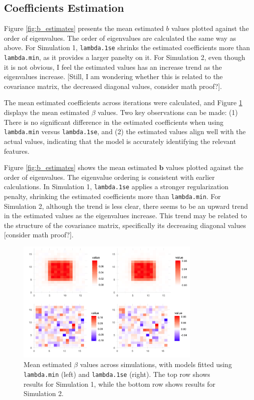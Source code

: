 \documentclass[12pt]{article}
\begin{document}
\subsection*{Coefficients Estimation}

Figure \ref{fig:b_estimates} presents the mean estimated \( b \) values plotted against the order of eigenvalues. The order of eigenvalues are calculated the same way as above. For Simulation 1, \texttt{lambda.1se} shrinks the estimated coefficients more than \texttt{lambda.min}, as it provides a larger panelty on it. For Simulation 2, even though it is not obvious, I feel the estimated values has an increase trend as the eigenvalues increase. [Still, I am wondering whether this is related to the covariance matrix, the decreased diagonal values, consider math proof?].

The mean estimated coefficients across iterations were calculated, and Figure \ref{fig:beta_estimates} displays the mean estimated \( \beta \) values. Two key observations can be made: (1) There is no significant difference in the estimated coefficients when using \texttt{lambda.min} versus \texttt{lambda.1se}, and (2) the estimated values align well with the actual values, indicating that the model is accurately identifying the relevant features.

Figure \ref{fig:b_estimates} shows the mean estimated \( \mathbf{b} \) values plotted against the order of eigenvalues. The eigenvalue ordering is consistent with earlier calculations. In Simulation 1, \texttt{lambda.1se} applies a stronger regularization penalty, shrinking the estimated coefficients more than \texttt{lambda.min}. For Simulation 2, although the trend is less clear, there seems to be an upward trend in the estimated values as the eigenvalues increase. This trend may be related to the structure of the covariance matrix, specifically its decreasing diagonal values [consider math proof?].

\begin{figure}[H]
	\centering
	\includegraphics[width=0.8\textwidth]{beta_estimates.png}
	\caption{Mean estimated \( \beta \) values across simulations, with models fitted using \texttt{lambda.min} (left) and
		\texttt{lambda.1se} (right). The top row shows results for Simulation 1, while the bottom row shows results for Simulation 2.}
	\label{fig:beta_estimates}
\end{figure}
\end{document}
